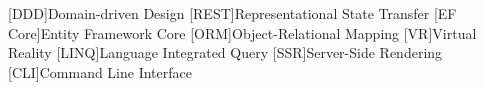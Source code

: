 [DDD]{Domain-driven Design}
[REST]{Representational State Transfer}
[EF Core]{Entity Framework Core}
[ORM]{Object-Relational Mapping}
[VR]{Virtual Reality}
[LINQ]{Language Integrated Query}
[SSR]{Server-Side Rendering}
[CLI]{Command Line Interface}